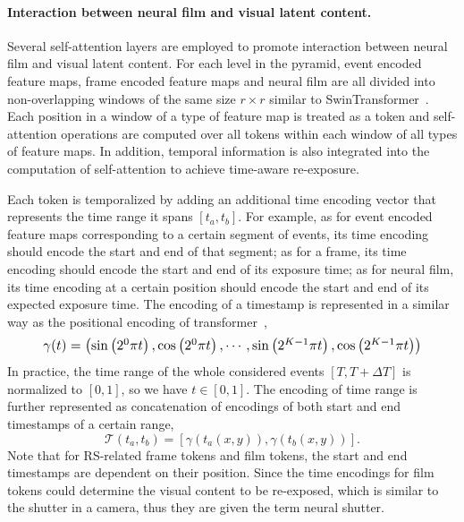 \documentclass[10pt,twocolumn,letterpaper]{article}
\begin{document}
\paragraph{Interaction between neural film and visual latent content.} 
Several self-attention layers are employed to promote interaction between neural film and visual latent content.
For each level in the pyramid, event encoded feature maps, frame encoded feature maps and neural film are all divided into non-overlapping windows of the same size $r\times r$ similar to SwinTransformer~\cite{SwinTransformer}.
Each position in a window of a type of feature map is treated as a token and self-attention operations are computed over all tokens within each window of all types of feature maps.
In addition, temporal information is also integrated into the computation of self-attention to achieve time-aware re-exposure.

Each token is temporalized by adding an additional time encoding vector that represents the time range it spans $[t_a, t_b]$.
For example, as for event encoded feature maps corresponding to a certain segment of events, its time encoding should encode the start and end of that segment; as for a frame, its time encoding should encode the start and end of its exposure time; as for neural film, its time encoding at a certain position should encode the start and end of its expected exposure time. 
The encoding of a timestamp is represented in a similar way as the positional encoding of transformer~\cite{Transformer},
\begin{equation}
\resizebox{0.9\columnwidth}{!}{
    $\gamma(t)=\left(\sin \left(2^0 \pi t\right), \cos \left(2^0 \pi t\right), \cdots, \sin \left(2^{K-1} \pi t\right), \cos \left(2^{K-1} \pi t\right)\right)$
}
\label{equ:time_encoding}
\end{equation}
In practice, the time range of the whole considered events $[T,T+\Delta T]$ is normalized to $[0, 1]$, so we have $t \in [0, 1]$.
The encoding of time range is further represented as concatenation of encodings of both start and end timestamps of a certain range, 
\begin{equation}
	\mathcal{T}(t_a, t_b) = [\gamma(t_a(x, y)), \gamma(t_b(x, y))].
	\label{equ:time_encoding_pair}
\end{equation} 
Note that for RS-related frame tokens and film tokens, the start and end timestamps are dependent on their position.
Since the time encodings for film tokens could determine the visual content to be re-exposed, which is similar to the shutter in a camera, thus they are given the term neural shutter.
\end{document}
